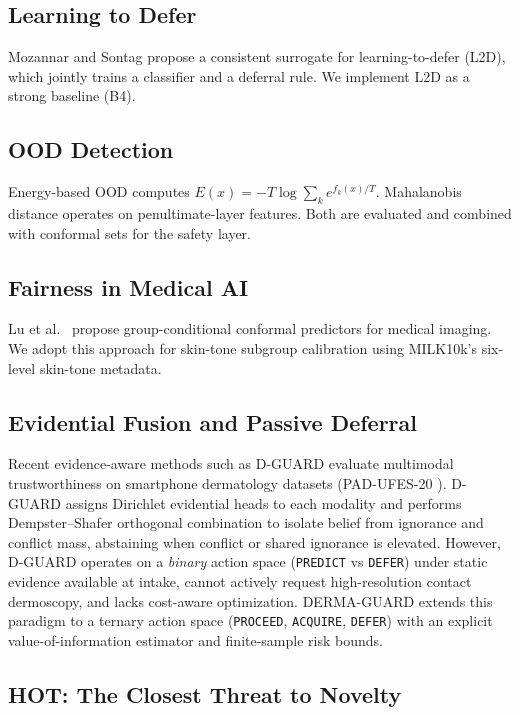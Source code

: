 \documentclass[conference]{IEEEtran}
\newcommand{\1}{\mathbf{1}}
\begin{document}
\subsection{Learning to Defer}

Mozannar and Sontag \cite{mozannar2020defer} propose a consistent surrogate
for learning-to-defer (L2D), which jointly trains a classifier and a
deferral rule. We implement L2D as a strong baseline (B4).

\subsection{OOD Detection}

Energy-based OOD \cite{liu2020energy} computes $E(x)=-T\log\sum_k e^{f_k(x)/T}$.
Mahalanobis distance \cite{lee2018mahalanobis} operates on
penultimate-layer features. Both are evaluated and combined with conformal
sets for the safety layer.

\subsection{Fairness in Medical AI}

Lu et al.\ \cite{lu2021fair} propose group-conditional conformal predictors
for medical imaging. We adopt this approach for skin-tone subgroup
calibration using MILK10k's six-level skin-tone metadata.

\subsection{Evidential Fusion and Passive Deferral}

Recent evidence-aware methods such as D-GUARD \cite{dguard2024} evaluate multimodal trustworthiness on smartphone dermatology datasets (PAD-UFES-20 \cite{pacheco2020padufes}). D-GUARD assigns Dirichlet evidential heads to each modality and performs Dempster--Shafer orthogonal combination to isolate belief from ignorance and conflict mass, abstaining when conflict or shared ignorance is elevated. However, D-GUARD operates on a \emph{binary} action space (\texttt{PREDICT} vs \texttt{DEFER}) under static evidence available at intake, cannot actively request high-resolution contact dermoscopy, and lacks cost-aware optimization. DERMA-GUARD extends this paradigm to a ternary action space (\texttt{PROCEED}, \texttt{ACQUIRE}, \texttt{DEFER}) with an explicit value-of-information estimator and finite-sample risk bounds.

\subsection{HOT: The Closest Threat to Novelty}
\end{document}
